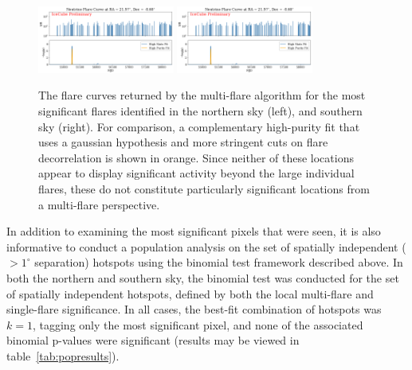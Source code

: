 \begin{figure}[h]
\centering
\includegraphics[width=0.4\textwidth]{figs/fcurve_sf_north.png}
\includegraphics[width=0.4\textwidth]{figs/fcurve_sf_north.png}
\caption{The flare curves returned by the multi-flare algorithm for the most significant flares identified in the northern sky (left), and southern sky (right). For comparison, a complementary high-purity fit that uses a gaussian hypothesis and more stringent cuts on flare decorrelation is shown in orange. Since neither of these locations appear to display significant activity beyond the large individual flares, these do not constitute particularly significant locations from a multi-flare perspective.}
\label{fig:mfhotspots}
\end{figure}

In addition to examining the most significant pixels that were seen, it is also informative to conduct a population analysis on the set of spatially independent ($>1^{\circ}$ separation) hotspots using the binomial test framework described above. In both the northern and southern sky, the binomial test was conducted for the set of spatially independent hotspots, defined by both the local multi-flare and single-flare significance. In all cases, the best-fit combination of hotspots was $k=1$, tagging only the most significant pixel, and none of the associated binomial p-values were significant (results may be viewed in table~\ref{tab:popresults}).

